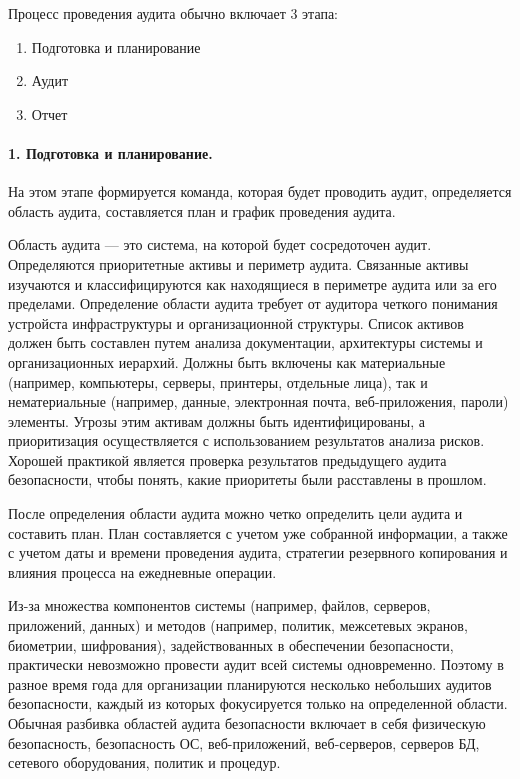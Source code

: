 Процесс проведения аудита обычно включает 3 этапа:
\begin{enumerate}
	\item Подготовка и планирование
	\item Аудит
	\item Отчет
\end{enumerate}

\paragraph{1. Подготовка и планирование.}

На этом этапе формируется команда, которая будет проводить аудит, определяется область аудита, составляется план и график проведения аудита.

Область аудита — это система, на которой будет сосредоточен аудит. Определяются приоритетные активы и периметр аудита. Связанные активы изучаются и классифицируются как находящиеся в периметре аудита или за его пределами. Определение области аудита требует от аудитора четкого понимания устройста инфраструктуры и организационной структуры. Список активов должен быть составлен путем анализа документации, архитектуры системы и организационных иерархий. Должны быть включены как материальные (например, компьютеры, серверы, принтеры, отдельные лица), так и нематериальные (например, данные, электронная почта, веб-приложения, пароли) элементы. Угрозы этим активам должны быть идентифицированы, а приоритизация осуществляется с использованием результатов анализа рисков. Хорошей практикой является проверка результатов предыдущего аудита безопасности, чтобы понять, какие приоритеты были расставлены в прошлом.

После определения области аудита можно четко определить цели аудита и составить план. План составляется с учетом уже собранной информации, а также с учетом даты и времени проведения аудита, стратегии резервного копирования и влияния процесса на ежедневные операции.

Из-за множества компонентов системы (например, файлов, серверов, приложений, данных) и методов (например, политик, межсетевых экранов, биометрии, шифрования), задействованных в обеспечении безопасности, практически невозможно провести аудит всей системы одновременно. Поэтому в разное время года для организации планируются несколько небольших аудитов безопасности, каждый из которых фокусируется только на определенной области. Обычная разбивка областей аудита безопасности включает в себя физическую безопасность, безопасность ОС, веб-приложений, веб-серверов, серверов БД, сетевого оборудования, политик и процедур.

